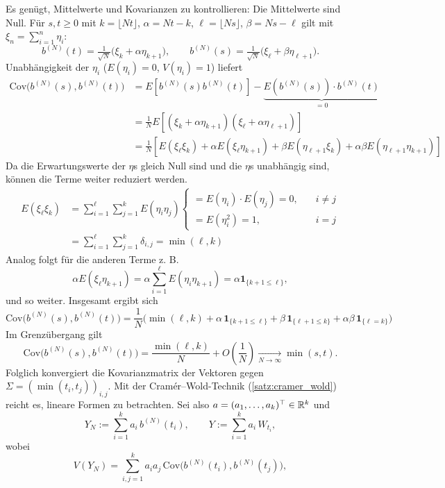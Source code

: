 \begin{satz}
Es genügt, Mittelwerte und Kovarianzen zu kontrollieren:
Die Mittelwerte sind Null. Für $s,t\ge0$ mit $k=\lfloor Nt\rfloor$, $\alpha=Nt-k$, 
$\ell=\lfloor Ns\rfloor$, $\beta=Ns-\ell$ gilt mit $\xi_n=\sum_{i=1}^n\eta_i$:
$$
b^{(N)}(t)=\tfrac1{\sqrt N}\big(\xi_k+\alpha\eta_{k+1}\big),\qquad
b^{(N)}(s)=\tfrac1{\sqrt N}\big(\xi_\ell+\beta\eta_{\ell+1}\big).
$$
Unabhängigkeit der $\eta_i$ ($E(\eta_i)=0$, $V(\eta_i)=1$) liefert
$$
\begin{aligned}
\mathrm{Cov}\!\big(b^{(N)}(s),b^{(N)}(t)\big) &= E \left [ b^{(N)}(s) b^{(N)}(t) \right ] - \underbrace{E(b^{(N)}(s)) \cdot b^{(N)}(t)}_{=0}
\\ &= \frac{1}{N} E \left [ (\xi_k + \alpha \eta_{k+1}) (\xi_\ell + \alpha \eta_{\ell+1}) \right ] 
\\ &= \frac{1}{N} \left [ E(\xi_\ell \xi_k) + \alpha E(\xi_\ell \eta_{k+1}) + \beta E(\eta_{\ell + 1} \xi_k) + \alpha \beta E(\eta_{\ell + 1} \eta_{k+1}) \right ]
\end{aligned}
$$
Da die Erwartungswerte der $\eta$s gleich Null sind und die $\eta$s unabhängig sind, können die Terme weiter reduziert werden.
$$
\begin{aligned}
E(\xi_\ell \xi_k) &= \sum_{i=1}^\ell \sum_{j=1}^k E(\eta_i \eta_j) \begin{cases} = E(\eta_i)\cdot E(\eta_j) = 0, \quad &i \neq j \\ = E(\eta_i^2) = 1, \quad &i = j \end{cases}
\\ &= \sum_{i=1}^\ell \sum_{j=1}^k \delta_{i, j} = \min(\ell, k)
\end{aligned}
$$
Analog folgt für die anderen Terme z. B.
$$\alpha E(\xi_\ell \eta_{k+1}) = \alpha \sum_{i=1}^\ell E(\eta_i \eta_{k+1}) = \alpha \mathbf 1_{\{k+1\le \ell\}},$$
und so weiter. Insgesamt ergibt sich
$$
\mathrm{Cov}\!\big(b^{(N)}(s),b^{(N)}(t)\big) = \frac1N\Big(\min(\ell,k)+\alpha\,\mathbf 1_{\{k+1\le \ell\}}+\beta\,\mathbf 1_{\{\ell+1\le k\}}+\alpha\beta\,\mathbf 1_{\{\ell=k\}}\Big)
$$
Im Grenzübergang gilt
$$
\mathrm{Cov}\!\big(b^{(N)}(s),b^{(N)}(t)\big)
=\frac{\min(\ell,k)}{N}+O\!\left(\frac1N\right)\xrightarrow[N\to\infty]{}\min(s,t).
$$
Folglich konvergiert die Kovarianzmatrix der Vektoren gegen 
$\Sigma=(\min(t_i,t_j))_{i,j}$.
Mit der Cramér–Wold-Technik (\ref{satz:cramer_wold}) reicht es, lineare Formen zu betrachten. Sei also $a=(a_1,\dots,a_k)^\top\in\Bbb R^k$ und
$$
Y_N:=\sum_{i=1}^k a_i\,b^{(N)}(t_i),\qquad
Y:=\sum_{i=1}^k a_i\,W_{t_i},
$$
wobei
$$
V(Y_N)=\sum_{i,j=1}^k a_i a_j\,\mathrm{Cov}\!\big(b^{(N)}(t_i),b^{(N)}(t_j)\big),
$$
\end{satz}
